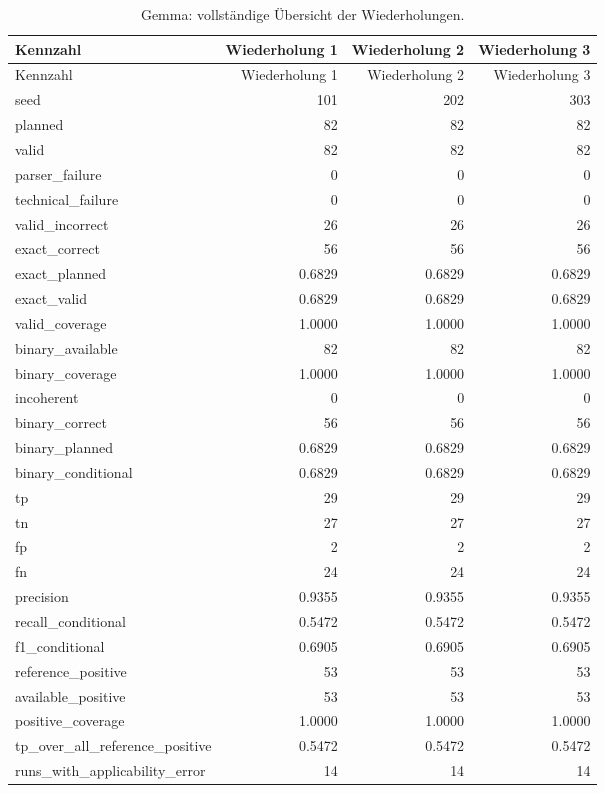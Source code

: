 \begingroup\small
\begin{longtable}{lrrr}
\caption{Gemma: vollständige Übersicht der Wiederholungen.}\label{tab_v2_repetitions_gemma}\\
\toprule
Kennzahl & Wiederholung 1 & Wiederholung 2 & Wiederholung 3 \\
\midrule
\endfirsthead
\toprule
Kennzahl & Wiederholung 1 & Wiederholung 2 & Wiederholung 3 \\
\midrule
\endhead
seed & 101 & 202 & 303 \\
planned & 82 & 82 & 82 \\
valid & 82 & 82 & 82 \\
parser\_failure & 0 & 0 & 0 \\
technical\_failure & 0 & 0 & 0 \\
valid\_incorrect & 26 & 26 & 26 \\
exact\_correct & 56 & 56 & 56 \\
exact\_planned & 0.6829 & 0.6829 & 0.6829 \\
exact\_valid & 0.6829 & 0.6829 & 0.6829 \\
valid\_coverage & 1.0000 & 1.0000 & 1.0000 \\
binary\_available & 82 & 82 & 82 \\
binary\_coverage & 1.0000 & 1.0000 & 1.0000 \\
incoherent & 0 & 0 & 0 \\
binary\_correct & 56 & 56 & 56 \\
binary\_planned & 0.6829 & 0.6829 & 0.6829 \\
binary\_conditional & 0.6829 & 0.6829 & 0.6829 \\
tp & 29 & 29 & 29 \\
tn & 27 & 27 & 27 \\
fp & 2 & 2 & 2 \\
fn & 24 & 24 & 24 \\
precision & 0.9355 & 0.9355 & 0.9355 \\
recall\_conditional & 0.5472 & 0.5472 & 0.5472 \\
f1\_conditional & 0.6905 & 0.6905 & 0.6905 \\
reference\_positive & 53 & 53 & 53 \\
available\_positive & 53 & 53 & 53 \\
positive\_coverage & 1.0000 & 1.0000 & 1.0000 \\
tp\_over\_all\_reference\_positive & 0.5472 & 0.5472 & 0.5472 \\
runs\_with\_applicability\_error & 14 & 14 & 14 \\
\bottomrule
\end{longtable}
\endgroup
